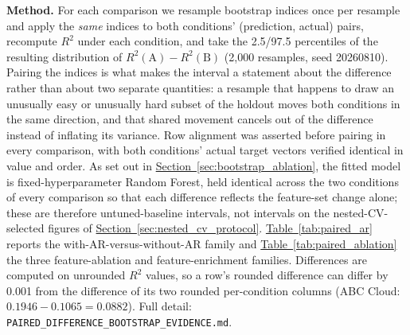 \documentclass[technologies,article,submit,pdftex,moreauthors]{Definitions/mdpi}
\begin{document}
\textbf{Method.} For each comparison we resample bootstrap indices once per resample and apply the \emph{same} indices to both conditions' (prediction, actual) pairs, recompute \(R^2\) under each condition, and take the 2.5/97.5 percentiles of the resulting distribution of \(R^2(\text{A}) - R^2(\text{B})\) (2,000 resamples, seed 20260810). Pairing the indices is what makes the interval a statement about the difference rather than about two separate quantities: a resample that happens to draw an unusually easy or unusually hard subset of the holdout moves both conditions in the same direction, and that shared movement cancels out of the difference instead of inflating its variance. Row alignment was asserted before pairing in every comparison, with both conditions' actual target vectors verified identical in value and order. As set out in \hyperref[sec:bootstrap_ablation]{Section~\ref*{sec:bootstrap_ablation}}, the fitted model is fixed-hyperparameter Random Forest, held identical across the two conditions of every comparison so that each difference reflects the feature-set change alone; these are therefore untuned-baseline intervals, not intervals on the nested-CV-selected figures of \hyperref[sec:nested_cv_protocol]{Section~\ref*{sec:nested_cv_protocol}}. \hyperref[tab:paired_ar]{Table~\ref*{tab:paired_ar}} reports the with-AR-versus-without-AR family and \hyperref[tab:paired_ablation]{Table~\ref*{tab:paired_ablation}} the three feature-ablation and feature-enrichment families. Differences are computed on unrounded \(R^2\) values, so a row's rounded difference can differ by 0.001 from the difference of its two rounded per-condition columns (ABC Cloud: \(0.1946 - 0.1065 = 0.0882\)). Full detail: \texttt{PAIRED\_DIFFERENCE\_BOOTSTRAP\_EVIDENCE.md}.
\end{document}
